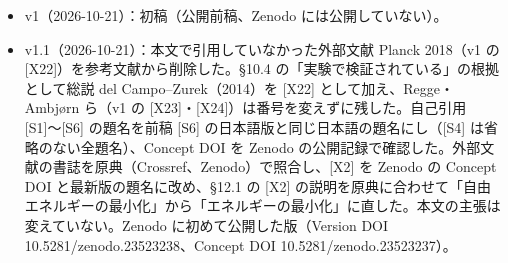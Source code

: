 \documentclass[
  a4paper,
]{ltjsarticle}
\providecommand{\tightlist}{%
  \setlength{\itemsep}{0pt}\setlength{\parskip}{0pt}}
\begin{document}
\begin{itemize}
\tightlist
\item
  v1（2026-10-21）：初稿（公開前稿、Zenodo には公開していない）。
\item
  v1.1（2026-10-21）：本文で引用していなかった外部文献 Planck 2018（v1
  の {[}X22{]}）を参考文献から削除した。§10.4
  の「実験で検証されている」の根拠として総説 del Campo--Zurek（2014）を
  {[}X22{]} として加え、Regge・Ambjørn ら（v1 の
  {[}X23{]}・{[}X24{]}）は番号を変えずに残した。自己引用
  {[}S1{]}〜{[}S6{]} の題名を前稿 {[}S6{]}
  の日本語版と同じ日本語の題名にし（{[}S4{]}
  は省略のない全題名）、Concept DOI を Zenodo
  の公開記録で確認した。外部文献の書誌を原典（Crossref、Zenodo）で照合し、{[}X2{]}
  を Zenodo の Concept DOI と最新版の題名に改め、§12.1 の {[}X2{]}
  の説明を原典に合わせて「自由エネルギーの最小化」から「エネルギーの最小化」に直した。本文の主張は変えていない。Zenodo
  に初めて公開した版（Version DOI 10.5281/zenodo.23523238、Concept DOI
  10.5281/zenodo.23523237）。
\end{itemize}
\end{document}
